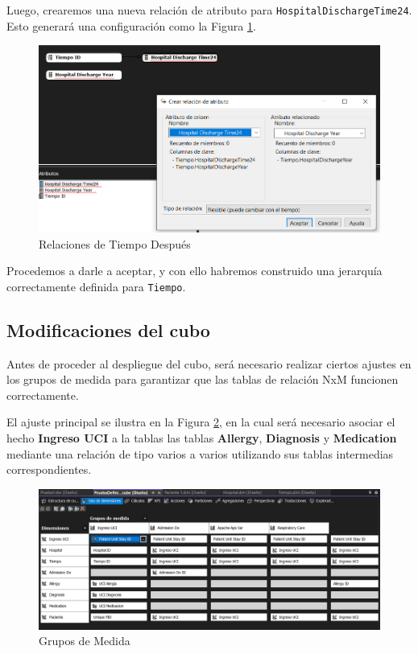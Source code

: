 \documentclass[12pt, a4paper, twoside]{article}
\begin{document}
Luego, crearemos una nueva relación de atributo para \texttt{HospitalDischargeTime24}. Esto generará una configuración como la Figura \ref{fig:27}.

\begin{figure}[H]
	\centering
	\includegraphics[width=1\textwidth]{image/relacionesTiempoDps2}
	\caption{Relaciones de Tiempo Después}
	\label{fig:27}
\end{figure}

Procedemos a darle a aceptar, y con ello habremos construido una jerarquía correctamente definida para \texttt{Tiempo}.


\subsection{Modificaciones del cubo}

Antes de proceder al despliegue del cubo, será necesario realizar ciertos ajustes en los grupos de medida para garantizar que las tablas de relación NxM funcionen correctamente. 

El ajuste principal se ilustra en la Figura \ref{fig:30}, en la cual será necesario asociar el hecho \textbf{Ingreso UCI} a la tablas  las tablas \textbf{Allergy}, \textbf{Diagnosis} y \textbf{Medication} mediante una relación de tipo varios a varios utilizando sus tablas intermedias correspondientes.

\begin{figure}[H]
	\centering
	\includegraphics[width=1\textwidth]{image/gruposMedida}
	\caption{Grupos de Medida}
	\label{fig:30}
\end{figure}
\end{document}
